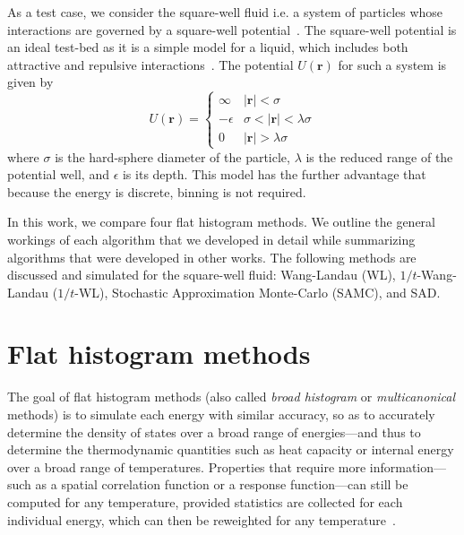 \documentclass[letterpaper,twocolumn,amsmath,amssymb,pre,aps,10pt]{revtex4-1}
\begin{document}
As a test case, we consider the square-well fluid i.e. a system of
particles whose interactions are governed by a square-well
potential~\cite{singh2003surface, barker2004perturbationSW}.  The
square-well potential is an ideal test-bed as it is a simple model for
a liquid, which includes both attractive and repulsive
interactions~\cite{barker1967-SW-perturbation, vega1992phase}.  The
potential $U(\textbf{r})$ for such a system is given by
\begin{equation}
 U(\textbf{r})=\begin{cases} \infty &
 \lvert\textbf{r}\rvert< \sigma\\-\epsilon &
 \sigma<\lvert\textbf{r}\rvert<\lambda\sigma\\0 &
 \lvert\textbf{r}\rvert > \lambda\sigma\end{cases}
\end{equation}
where $\sigma$ is the hard-sphere diameter of the particle, $\lambda$ is the
reduced range of the potential well, and $\epsilon$ is its depth.
This model has the further advantage that because the energy is
discrete, binning is not required.


In this work, we compare four flat histogram methods.  We outline the
general workings of each algorithm that we developed in detail while
summarizing algorithms that were developed in other works.  The
following methods are discussed and simulated for the square-well
fluid: Wang-Landau (WL), $1/t$-Wang-Landau ($1/t$-WL), Stochastic
Approximation Monte-Carlo (SAMC), and SAD.

\section{Flat histogram methods}\label{sec:histogram}

The goal of flat histogram methods (also called \emph{broad histogram}
or \emph{multicanonical} methods) is to simulate each energy with
similar accuracy, so as to accurately determine the density of states
over a broad range of energies---and thus to determine the thermodynamic
quantities such as heat capacity or internal energy
over a broad range of temperatures.
Properties that require more information---such as a spatial
correlation function or a response function---can still be computed
for any temperature, provided statistics are collected for each
individual energy, which can then be reweighted for any
temperature~\cite{errington2003direct}.
\end{document}
